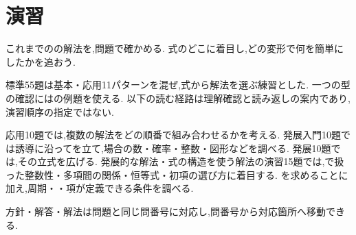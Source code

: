 
  \section{演習}\label{節：問題演習}
    これまでのの解法を,問題で確かめる.
                式のどこに着目し,どの変形で何を簡単にしたかを追おう.
    \par\smallskip
    標準55題は基本・応用11パターンを混ぜ,式から解法を選ぶ練習とした.
                一つの型の確認にはの例題を使える.
                以下の読む経路は理解確認と読み返しの案内であり,演習順序の指定ではない.
    \par\smallskip
    応用10題では,複数の解法をどの順番で組み合わせるかを考える.
    発展入門10題では誘導に沿ってを立て,場合の数・確率・整数・図形などを調べる.
                発展10題では,その立式を広げる.
    発展的な解法・式の構造を使う解法の演習15題では,で扱った整数性・多項間の関係・恒等式・初項の選び方に着目する.
    を求めることに加え,周期・・項が定義できる条件を調べる.
    \par\smallskip
    方針・解答・解法は問題と同じ問番号に対応し,問番号から対応箇所へ移動できる.








